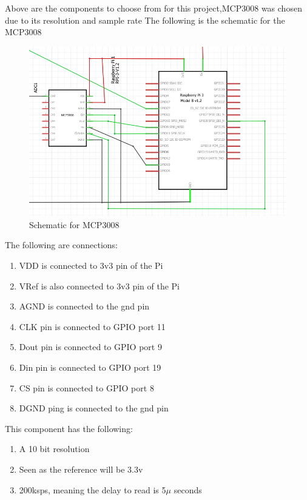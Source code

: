 Above are the components  to choose from 
for this project,MCP3008 was chosen due to its  resolution and  sample rate
\newpage
The following is the schematic for the  MCP3008\cite{ada}
\begin{figure}[h!]
	\centering
	\includegraphics[width=0.6\linewidth]{Images/SchematicforMCP300.png}
	\caption{Schematic for  MCP3008}
	\label{Schematic for  MCP3008}
\end{figure}

The following are connections:
\begin{enumerate}
	\item VDD is connected to 3v3 pin of the  Pi
	\item VRef is  also connected to  3v3 pin of the  Pi
	\item AGND is connected to the gnd pin 
	\item CLK pin is connected to GPIO port 11
	\item Dout pin is connected to GPIO port 9
	\item Din pin is connected to GPIO port 19
	\item CS pin  is connected  to GPIO port 8
	\item DGND ping is connected to the gnd pin
\end{enumerate}

This  component has the following:
\begin{enumerate}
	\item A 10 bit resolution
	\item Seen as  the  reference  will  be 3.3v  
	\item 200ksps, meaning the delay to read is 5$\mu$ seconds
\end{enumerate}

